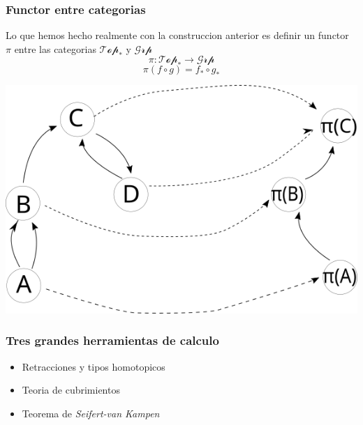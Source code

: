 \documentclass[xetex,mathserif,serif]{beamer}
\newcommand{\vank}{\emph{Seifert-van Kampen} }
\begin{document}
  \begin{frame}
    \frametitle{Functor entre categorias}
    Lo que hemos hecho realmente con la construccion anterior es definir
    un functor \(\pi\) entre las categorias \(\mathscr{Top}_*\) y
    \(\mathscr{Grp}\)
    \[ \pi : \mathscr{Top}_* \to \mathscr{Grp} \]
    \[ \pi (f \circ g) = f_* \circ g_* \]
    \begin{center}
      \includegraphics[scale=0.4]{./imag/categoria.png}
    \end{center}
  \end{frame}
  \begin{frame}
    \frametitle{Tres grandes herramientas de calculo}
    \begin{itemize}
    \item Retracciones y tipos homotopicos
    \item Teoria de cubrimientos
    \item Teorema de \vank
    \end{itemize}
  \end{frame}
\end{document}
